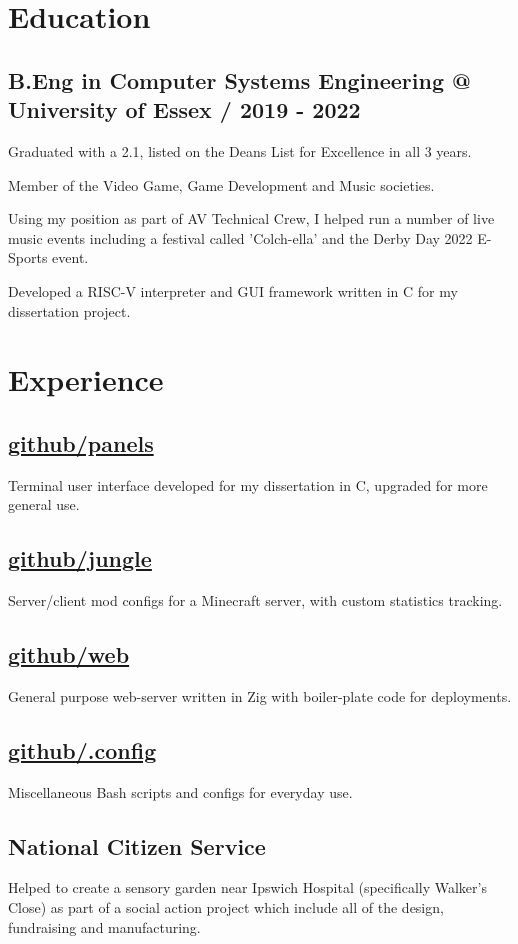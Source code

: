 \documentclass{article}
\newcommand{\github}{https://github.com/mskorczak}
\begin{document}
\section{Education}

\subsection{B.Eng in Computer Systems Engineering @ University of Essex / 2019 - 2022}
\begin{compactitem}
\item Graduated with a 2.1, listed on the Deans List for Excellence in all 3 years.
\item Member of the Video Game, Game Development and Music societies.
\item Using my position as part of AV Technical Crew, I helped run a number of live music events including a festival called 'Colch-ella' and the Derby Day 2022 E-Sports event.
\item Developed a RISC-V interpreter and GUI framework written in C for my dissertation project.
\end{compactitem}

\section{Experience}

\subsection{\href{\github/panels}{github/panels}} Terminal user interface developed for my dissertation in C, upgraded for more general use.
\subsection{\href{\github/jungle}{github/jungle}} Server/client mod configs for a Minecraft server, with custom statistics tracking.
\subsection{\href{\github/web}{github/web}} General purpose web-server written in Zig with boiler-plate code for deployments.
\subsection{\href{\github/.config}{github/.config}} Miscellaneous Bash scripts and configs for everyday use.  
\subsection{National Citizen Service} Helped to create a sensory garden near Ipswich Hospital (specifically Walker's Close) as part of a social action project which include all of the design, fundraising and manufacturing.
\end{document}
